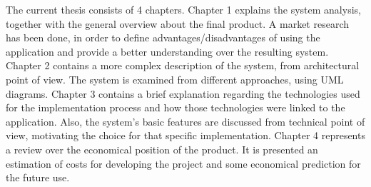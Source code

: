 The current thesis consists of 4 chapters. Chapter 1 explains the system analysis, together with the general overview about the final product. A market research has been done, in order to define advantages/disadvantages of using the application and provide a better understanding over the resulting system. Chapter 2 contains a more complex description of the system, from architectural point of view. The system is examined from different approaches, using UML diagrams. Chapter 3 contains a brief explanation regarding the technologies used for the implementation process and how those technologies were linked to the application. Also, the system's basic features are discussed from technical point of view, motivating the choice for that specific implementation. Chapter 4 represents a review over the economical position of the product. It is presented an estimation of costs for developing the project and some economical prediction for the future use.